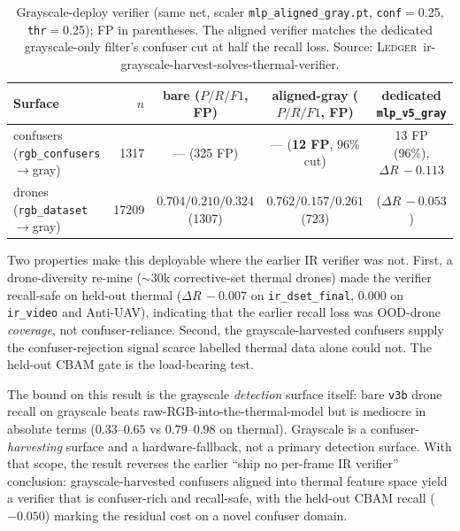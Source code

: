\begin{table}[htbp]
    \centering
    \caption{Grayscale-deploy verifier (same net, scaler \texttt{mlp\_aligned\_gray.pt}, \texttt{conf}$=$0.25, \texttt{thr}$=$0.25); FP in parentheses. The aligned verifier matches the dedicated grayscale-only filter's confuser cut at half the recall loss. Source: \textsc{Ledger}~ir-grayscale-harvest-solves-thermal-verifier.}
    \label{tab:ir_aligned_gray}
    \begin{tabular}{lrccc}
        \toprule
        Surface & $n$ & bare ($P/R/F1$, FP) & aligned-gray ($P/R/F1$, FP) & dedicated \texttt{mlp\_v5\_gray} \\
        \midrule
        confusers (\texttt{rgb\_confusers}$\to$gray) & 1317  & --- (325 FP) & --- (\textbf{12 FP}, 96\% cut) & 13 FP (96\%), $\Delta R\,{-}0.113$ \\
        drones (\texttt{rgb\_dataset}$\to$gray)      & 17209 & $0.704/0.210/0.324$ (1307) & $0.762/0.157/0.261$ (723) & ($\Delta R\,{-}0.053$) \\
        \bottomrule
    \end{tabular}
\end{table}

Two properties make this deployable where the earlier IR verifier was not. First, a drone-diversity re-mine ($\sim$30k corrective-set thermal drones) made the verifier recall-safe on held-out thermal ($\Delta R\,{-}0.007$ on \texttt{ir\_dset\_final}, $0.000$ on \texttt{ir\_video} and Anti-UAV), indicating that the earlier recall loss was OOD-drone \emph{coverage}, not confuser-reliance. Second, the grayscale-harvested confusers supply the confuser-rejection signal scarce labelled thermal data alone could not. The held-out CBAM gate is the load-bearing test.

The bound on this result is the grayscale \emph{detection} surface itself: bare \texttt{v3b} drone recall on grayscale beats raw-RGB-into-the-thermal-model but is mediocre in absolute terms ($0.33$--$0.65$ vs $0.79$--$0.98$ on thermal). Grayscale is a confuser-\emph{harvesting} surface and a hardware-fallback, not a primary detection surface. With that scope, the result reverses the earlier ``ship no per-frame IR verifier'' conclusion: grayscale-harvested confusers aligned into thermal feature space yield a verifier that is confuser-rich and recall-safe, with the held-out CBAM recall ($-0.050$) marking the residual cost on a novel confuser domain.

